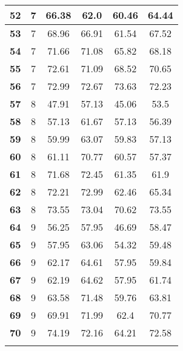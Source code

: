 \begin{longtable}{|c|c|c|c|c|c|}
\textbf{52} & 7 & 66.38 & 62.0 & 60.46 & 64.44 \\ \hline 
\textbf{53} & 7 & 68.96 & 66.91 & 61.54 & 67.52 \\ \hline 
\textbf{54} & 7 & 71.66 & 71.08 & 65.82 & 68.18 \\ \hline 
\textbf{55} & 7 & 72.61 & 71.09 & 68.52 & 70.65 \\ \hline 
\textbf{56} & 7 & 72.99 & 72.67 & 73.63 & 72.23 \\ \hline 
\textbf{57} & 8 & 47.91 & 57.13 & 45.06 & 53.5 \\ \hline 
\textbf{58} & 8 & 57.13 & 61.67 & 57.13 & 56.39 \\ \hline 
\textbf{59} & 8 & 59.99 & 63.07 & 59.83 & 57.13 \\ \hline 
\textbf{60} & 8 & 61.11 & 70.77 & 60.57 & 57.37 \\ \hline 
\textbf{61} & 8 & 71.68 & 72.45 & 61.35 & 61.9 \\ \hline 
\textbf{62} & 8 & 72.21 & 72.99 & 62.46 & 65.34 \\ \hline 
\textbf{63} & 8 & 73.55 & 73.04 & 70.62 & 73.55 \\ \hline 
\textbf{64} & 9 & 56.25 & 57.95 & 46.69 & 58.47 \\ \hline 
\textbf{65} & 9 & 57.95 & 63.06 & 54.32 & 59.48 \\ \hline 
\textbf{66} & 9 & 62.17 & 64.61 & 57.95 & 59.84 \\ \hline 
\textbf{67} & 9 & 62.19 & 64.62 & 57.95 & 61.74 \\ \hline 
\textbf{68} & 9 & 63.58 & 71.48 & 59.76 & 63.81 \\ \hline 
\textbf{69} & 9 & 69.91 & 71.99 & 62.4 & 70.77 \\ \hline 
\textbf{70} & 9 & 74.19 & 72.16 & 64.21 & 72.58 \\ \hline 

    \caption[]{}
    \label{Tab:}
\end{longtable}